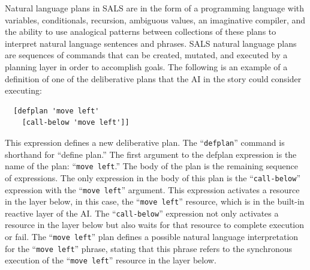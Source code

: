 Natural language plans in SALS are in the form of a programming
language with variables, conditionals, recursion, ambiguous values, an
imaginative compiler, and the ability to use analogical patterns
between collections of these plans to interpret natural language
sentences and phrases.  SALS natural language plans are sequences of
commands that can be created, mutated, and executed by a planning
layer in order to accomplish goals.  The following is an example of a
definition of one of the deliberative plans that the AI in the story
could consider executing:
\begin{samepage}
\begin{Verbatim}
  [defplan 'move left'
    [call-below 'move left']]
\end{Verbatim}
\end{samepage}
This expression defines a new deliberative plan.  The
``{\tt{defplan}}'' command is shorthand for ``define plan.''  The
first argument to the defplan expression is the name of the plan:
``{\tt{move left}}.''  The body of the plan is the remaining sequence
of expressions.  The only expression in the body of this plan is the
``{\tt{call-below}}'' expression with the ``{\tt{move left}}''
argument.  This expression activates a resource in the layer below, in
this case, the ``{\tt{move left}}'' resource, which is in the built-in
reactive layer of the AI.  The ``{\tt{call-below}}'' expression not
only activates a resource in the layer below but also waits for that
resource to complete execution or fail.  The ``{\tt{move left}}'' plan
defines a possible natural language interpretation for the ``{\tt{move
    left}}'' phrase, stating that this phrase refers to the
synchronous execution of the ``{\tt{move left}}'' resource in the
layer below.

